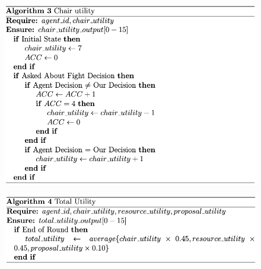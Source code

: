 \begin{figure}[htb]
    \centering
    \includegraphics[scale=0.7]{006_team_3_agent_design/FIGS/Algo3.png}
    \label{fig:algo3}
\end{figure}



\begin{figure}[htb]
    \centering
    \includegraphics[scale=0.7]{006_team_3_agent_design/FIGS/Algo4.png}
    \label{fig:algo4}
\end{figure}

